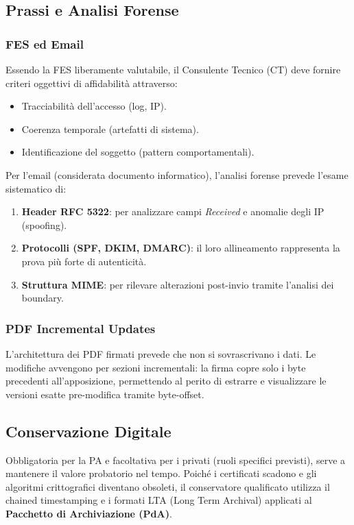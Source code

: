 \documentclass[11pt,a4paper]{article}
\begin{document}
\subsection{Prassi e Analisi Forense}
\subsubsection{FES ed Email}
Essendo la FES liberamente valutabile, il Consulente Tecnico (CT) deve fornire criteri oggettivi di affidabilità attraverso:
\begin{itemize}
    \item Tracciabilità dell'accesso (log, IP).
    \item Coerenza temporale (artefatti di sistema).
    \item Identificazione del soggetto (pattern comportamentali).
\end{itemize}

Per l'email (considerata documento informatico), l'analisi forense prevede l'esame sistematico di:
\begin{enumerate}
    \item \textbf{Header RFC 5322}: per analizzare campi \textit{Received} e anomalie degli IP (spoofing).
    \item \textbf{Protocolli (SPF, DKIM, DMARC)}: il loro allineamento rappresenta la prova più forte di autenticità.
    \item \textbf{Struttura MIME}: per rilevare alterazioni post-invio tramite l'analisi dei boundary.
\end{enumerate}

\subsubsection{PDF Incremental Updates}
L'architettura dei PDF firmati prevede che non si sovrascrivano i dati. Le modifiche avvengono per sezioni incrementali: la firma copre solo i byte precedenti all'apposizione, permettendo al perito di estrarre e visualizzare le versioni esatte pre-modifica tramite byte-offset.

\subsection{Conservazione Digitale}
Obbligatoria per la PA e facoltativa per i privati (ruoli specifici previsti), serve a mantenere il valore probatorio nel tempo. Poiché i certificati scadono e gli algoritmi crittografici diventano obsoleti, il conservatore qualificato utilizza il chained timestamping e i formati LTA (Long Term Archival) applicati al \textbf{Pacchetto di Archiviazione (PdA)}.
\end{document}
